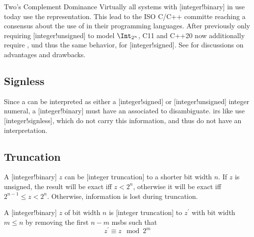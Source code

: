 \begin{highlight}{Two's Complement Dominance}
Virtually all systems with [integer!binary] in use today use the  representation.
This lead to the ISO C/C++ committe reaching a consensus about the use of  in their programming languages.
After previously only requiring [integer!unsigned] to model \(\Int_{2^n}\), C11 and C++20 now additionally require , und thus the same behavior, for [integer!signed].
See \cite{ISO_C_N2218,ISO_C_P0907R4} for discussions on advantages and drawbacks.
\end{highlight}

\subsection{Signless}

Since a  can be interpreted as either a [integer!signed] or [integer!unsigned] integer numeral, a [integer!binary] must have an associated  to disambiguate.
\Glspl{ir} like \LLVMIR use [integer!signless], which do not carry this information, and thus do not have an interpretation.

\subsection{Truncation}

A [integer!binary] \(z\) can be [integer truncation] to a shorter bit width \(n\).
If \(z\) is unsigned, the result will be exact iff \(z < 2^n\), otherwise it will be exact iff \(2^{n-1} \le z < 2^{n}\).
Otherwise, information is lost during truncation.

\begin{definition}
    A [integer!binary] \(z\) of bit width \(n\) is [integer truncation] to \(z^\prime\) with bit width \(m \le n\) by removing the first \(n - m\) \glspl{msb} such that
    \begin{equation*}
        \label{eq:trunc}
        \tag{trunc}
        z^\prime \equiv z \mod 2^m
    \end{equation*}
\end{definition}

